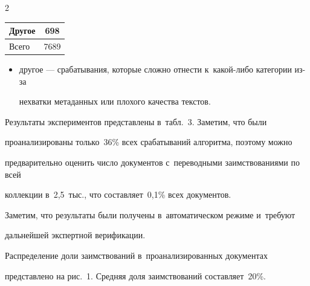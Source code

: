 \begin{multicols}{2}
\begin{center}
{\begin{tabular}{|l|c|}
Другое & 698 \\ 


\hline 




Всего & 7689\hphantom{9} \\ 


\hline


\end{tabular}


}


\end{center}















\begin{itemize}


\item другое --- срабатывания, которые сложно отнести к~ка\-кой-ли\-бо категории из-за 


нехватки метаданных или плохого качества текстов.


\end{itemize}





Результаты экспериментов представлены в~табл.~3. Заметим, что были 


проанализированы только~36\% всех срабатываний алгоритма, поэтому можно 


предварительно оценить число документов с~переводными заимствованиями по всей 


коллекции в~2,5~тыс., что составляет~0,1\% всех документов. 


Заметим, что результаты были получены в~автоматическом режиме и~требуют 


дальнейшей экспертной верификации.














Распределение доли заимствований в~проанализированных документах 


представлено на рис.~1. Средняя доля заимствований со\-став\-ля\-ет~20\%.






\end{multicols}
